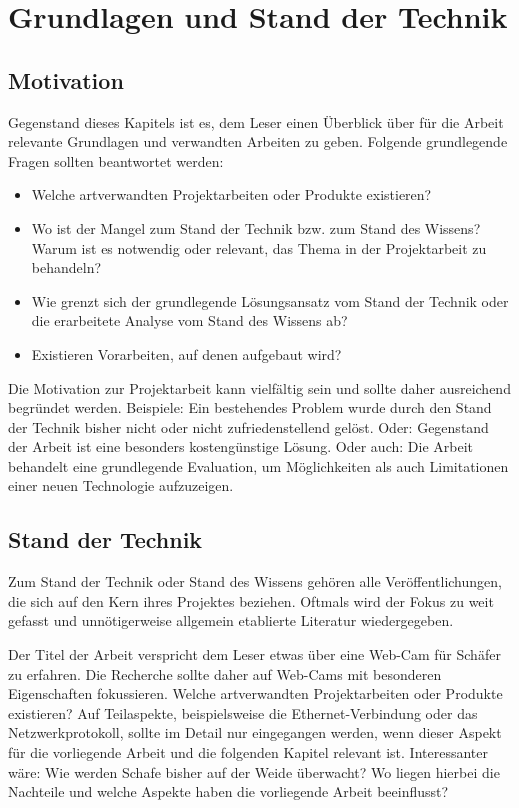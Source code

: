 
\chapter{Grundlagen und Stand der Technik}
\label{sec:Grundlagen}

\section{Motivation}
Gegenstand dieses Kapitels ist es, dem Leser einen Überblick über für die Arbeit relevante Grundlagen und verwandten Arbeiten zu geben. Folgende grundlegende Fragen sollten beantwortet werden:
\begin{itemize}
	\item Welche artverwandten Projektarbeiten oder Produkte existieren?
	\item Wo ist der Mangel zum Stand der Technik bzw. zum Stand des Wissens? Warum ist es notwendig oder relevant, das Thema in der Projektarbeit zu behandeln? 
	\item Wie grenzt sich der grundlegende Lösungsansatz vom Stand der Technik oder die erarbeitete Analyse vom Stand des Wissens ab?
	\item Existieren Vorarbeiten, auf denen aufgebaut wird?
\end{itemize}

Die Motivation zur Projektarbeit kann vielfältig sein und sollte daher ausreichend begründet werden. Beispiele: Ein bestehendes Problem wurde durch den Stand der Technik bisher nicht oder nicht zufriedenstellend gelöst. Oder: Gegenstand der Arbeit ist eine besonders kostengünstige Lösung. Oder auch: Die Arbeit behandelt eine grundlegende Evaluation, um Möglichkeiten als auch Limitationen einer neuen Technologie aufzuzeigen.

\section{Stand der Technik}
\label{sec:StandderTechnik}

Zum Stand der Technik oder Stand des Wissens gehören alle Veröffentlichungen, die sich auf den Kern ihres Projektes beziehen. Oftmals wird der Fokus zu weit gefasst und unnötigerweise allgemein etablierte Literatur wiedergegeben.

\example Der Titel der Arbeit verspricht dem Leser etwas über eine Web-Cam für Schäfer zu erfahren. 
Die Recherche sollte daher auf Web-Cams mit besonderen Eigenschaften fokussieren. Welche artverwandten Projektarbeiten oder Produkte existieren? Auf Teilaspekte, beispielsweise die Ethernet-Verbindung oder das Netzwerkprotokoll, sollte im Detail nur eingegangen werden, wenn dieser Aspekt für die vorliegende Arbeit und die folgenden Kapitel relevant ist. Interessanter wäre: Wie werden Schafe bisher auf der Weide überwacht? Wo liegen hierbei die Nachteile und welche Aspekte haben die vorliegende Arbeit beeinflusst?\\

